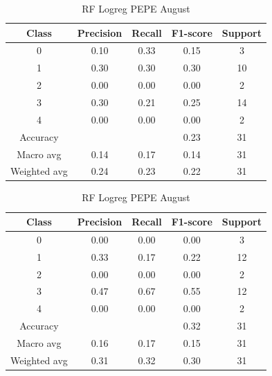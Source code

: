 \begin{enumerate}
\begin{enumerate}
                \begin{table}[H]
                \centering
                \scriptsize
                \begin{minipage}{0.48\textwidth}
                \centering
                \begin{tabular}{c|cccc}
                \hline
                Class & Precision & Recall & F1-score & Support \\
                \hline
                0 & 0.10 & 0.33 & 0.15 & 3 \\
                1 & 0.30 & 0.30 & 0.30 & 10 \\
                2 & 0.00 & 0.00 & 0.00 & 2 \\
                3 & 0.30 & 0.21 & 0.25 & 14 \\
                4 & 0.00 & 0.00 & 0.00 & 2 \\
                \hline
                Accuracy &       &      & 0.23 & 31 \\
                Macro avg & 0.14 & 0.17 & 0.14 & 31 \\
                Weighted avg & 0.24 & 0.23 & 0.22 & 31 \\
                \hline
                \end{tabular}
                \caption{RF Logreg DOGE August}
                \label{tab:classifier_2_report_rf_logreg_doge_filtered_aug}
                \end{minipage}
                \hfill
                \begin{minipage}{0.48\textwidth}
                \centering
                \begin{tabular}{c|cccc}
                \hline
                Class & Precision & Recall & F1-score & Support \\
                \hline
                0 & 0.00 & 0.00 & 0.00 & 3 \\
                1 & 0.33 & 0.17 & 0.22 & 12 \\
                2 & 0.00 & 0.00 & 0.00 & 2 \\
                3 & 0.47 & 0.67 & 0.55 & 12 \\
                4 & 0.00 & 0.00 & 0.00 & 2 \\
                \hline
                Accuracy &       &      & 0.32 & 31 \\
                Macro avg & 0.16 & 0.17 & 0.15 & 31 \\
                Weighted avg & 0.31 & 0.32 & 0.30 & 31 \\
                \hline
                \end{tabular}
                \caption{RF Logreg PEPE August}
                \label{tab:classifier_2_report_rf_logreg_pepe_filtered_aug}
                \end{minipage}
                

\end{table}
\end{enumerate}
\end{enumerate}
